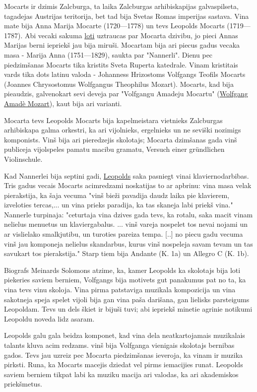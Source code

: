 \documentclass[a4paper]{article}
\begin{document}
\raggedright Mocarts ir dzimis Zalcburga, ta laika Zalcburgas arhibiskapijas galvaspilseta, tagadejas Austrijas teritorija, bet tad bija Svetas Romas imperijas sastava. Vina mate bija Anna Marija Mocarte (1720—1778) un tevs Leopolds Mocarts (1719—1787). Abi vecaki sakuma \underline{loti} uztraucas par Mocarta dzivibu, jo pieci Annas Marijas berni iepriekš jau bija miruši. Mocartam bija ari piecus gadus vecaka masa - Marija Anna (1751—1829), saukta par "Nannerli". Dienu pec piedzimšanas Mocarts tika kristits Sveta Ruperta katedrale. Vinam kristitais vards tika dots latinu valoda - Johanness Hrizostoms Volfgangs Teofils Mocarts (Joannes Chrysostomus Wolfgangus Theophilus Mozart). Mocarts, kad bija pieaudzis, galvenokart sevi deveja par "Volfgangu Amadeju Mocartu" (\underline{Wolfgang Amadè Mozart}), kaut bija ari varianti.

Mocarta tevs Leopolds Mocarts bija kapelmeistara vietnieks Zalcburgas arhibiskapa galma orkestri, ka ari vijolnieks, ergelnieks un ne seviški nozimigs komponists. Vinš bija ari pieredzejis skolotajs; Mocarta dzimšanas gada vinš publiceja vijolspeles pamatu macibu gramatu, Versuch einer gründlichen Violinschule.

Kad Nannerlei bija septini gadi, \underline{Leopolds} saka pasniegt vinai klaviernodarbibas. Tris gadus vecais Mocarts acimredzami noskatijas to ar apbrinu: vina masa velak pierakstija, ka šaja vecuma "vinš bieži pavadija daudz laika pie klavierem, izveloties tercas,... un vina prieks paradija, ka tas skaneja labi priekš vina." Nannerle turpinaja: "ceturtaja vina dzives gada tevs, ka rotalu, saka macit vinam nelielus menuetus un klaviergabalus. ... vinš vareja nospelet tos nevai nojami un ar vislielako smalkjutibu, un turoties pareiza tempa. [..] no piecu gadu vecuma vinš jau komponeja nelielus skandarbus, kurus vinš nospeleja savam tevam un tas savukart tos pierakstija." Starp tiem bija Andante (K. 1a) un Allegro C (K. 1b).

Biografs Meinards Solomons atzime, ka, kamer Leopolds ka skolotajs bija loti piekeries saviem berniem, Volfgangs bija motivets gut panakumus pat no ta, ka vina tevs vinu skoloja. Vina pirma patstaviga muzikala kompozicija un vina sakotneja speja spelet vijoli bija gan vina paša darišana, gan lielisks parsteigums Leopoldam. Tevs un dels škiet ir bijuši tuvi; abi iepriekš minetie agrinie notikumi Leopoldu noveda lidz asaram.

Leopolds galu gala beidza komponet, kad vina dela neatkartojamais muzikalais talants kluva acim redzams. vinš bija Volfganga vienigais skolotajs bernibas gados. Tevs jau uzreiz pec Mocarta piedzimšanas ieveroja, ka vinam ir muzika pirksti. Runa, ka Mocarts macejis dziedat vel pirms iemacijies runat. Leopolds saviem berniem tikpat labi ka muziku macija ari valodas, ka ari akademiskos priekšmetus.
\end{document}
